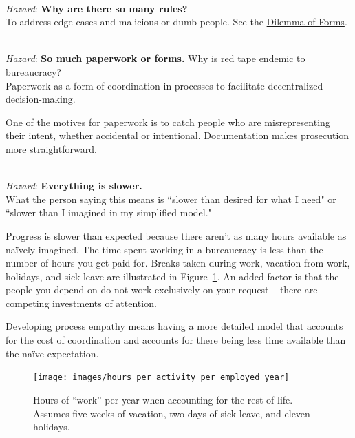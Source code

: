 \ \\
\textit{Hazard}: \textbf{Why are there so many rules?}\\
To address edge cases and malicious or dumb people. See the \hyperref[table:dilemma-subject-forms]{Dilemma of Forms}.

\ \\
\textit{Hazard}: \textbf{So much paperwork or forms.}
Why is red tape endemic to bureaucracy?\\
Paperwork as a form of coordination in processes to facilitate decentralized decision-making. 

One of the motives for paperwork is to catch people who are misrepresenting their intent, whether accidental or intentional. Documentation makes prosecution more straightforward.

\ \\
\textit{Hazard}: \textbf{Everything is slower.}\\
What the person saying this means is ``slower than desired for what I need" or ``slower than I imagined in my simplified model."

Progress is slower than expected because there aren't as many hours available as na\"ively imagined. The  time spent working in a bureaucracy is less than the number of hours you get paid for. Breaks taken during work, vacation from work, holidays, and sick leave are illustrated in Figure~\ref{fig:hours_per_year}. An added factor is that the people you depend on do not work exclusively on your request -- there are competing investments of attention. 

Developing \gls{process empathy} means having a more detailed model that accounts for the cost of coordination and accounts for there being less time available than the na\"ive expectation. 


\begin{figure}[!htb] %
    \centering
    \texttt{[image: images/hours\_per\_activity\_per\_employed\_year]}
    \caption{Hours of ``work'' per year when accounting for the rest of life. Assumes five weeks of vacation, two days of sick leave, and eleven holidays.}
    \label{fig:hours_per_year}
\end{figure}

